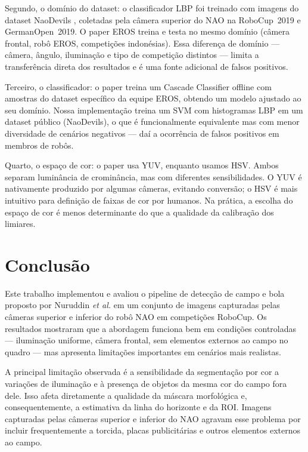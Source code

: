 \documentclass[journal]{IEEEtran}
\begin{document}
Segundo, o domínio do dataset: o classificador LBP foi treinado com imagens do dataset NaoDevils \cite{naodevils2019}, coletadas pela câmera superior do NAO na RoboCup~2019 e GermanOpen~2019. O paper EROS treina e testa no mesmo domínio (câmera frontal, robô EROS, competições indonésias). Essa diferença de domínio — câmera, ângulo, iluminação e tipo de competição distintos — limita a transferência direta dos resultados e é uma fonte adicional de falsos positivos.

Terceiro, o classificador: o paper treina um Cascade Classifier offline com amostras do dataset específico da equipe EROS, obtendo um modelo ajustado ao seu domínio. Nossa implementação treina um SVM com histogramas LBP em um dataset público (NaoDevils), o que é funcionalmente equivalente mas com menor diversidade de cenários negativos — daí a ocorrência de falsos positivos em membros de robôs.

Quarto, o espaço de cor: o paper usa YUV, enquanto usamos HSV. Ambos separam luminância de crominância, mas com diferentes sensibilidades. O YUV é nativamente produzido por algumas câmeras, evitando conversão; o HSV é mais intuitivo para definição de faixas de cor por humanos. Na prática, a escolha do espaço de cor é menos determinante do que a qualidade da calibração dos limiares.

\section{Conclusão}

Este trabalho implementou e avaliou o pipeline de detecção de campo e bola proposto por Nuruddin \textit{et al.} \cite{nuruddin2018} em um conjunto de imagens capturadas pelas câmeras superior e inferior do robô NAO em competições RoboCup. Os resultados mostraram que a abordagem funciona bem em condições controladas — iluminação uniforme, câmera frontal, sem elementos externos ao campo no quadro — mas apresenta limitações importantes em cenários mais realistas.

A principal limitação observada é a sensibilidade da segmentação por cor a variações de iluminação e à presença de objetos da mesma cor do campo fora dele. Isso afeta diretamente a qualidade da máscara morfológica e, consequentemente, a estimativa da linha do horizonte e da ROI. Imagens capturadas pelas câmeras superior e inferior do NAO agravam esse problema por incluir frequentemente a torcida, placas publicitárias e outros elementos externos ao campo.
\end{document}
